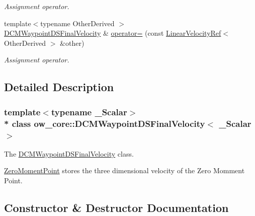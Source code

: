 \begin{DoxyCompactItemize}
\begin{DoxyCompactList}\small\item\em Assignment operator. \end{DoxyCompactList}\item 
{\footnotesize template$<$typename Other\+Derived $>$ }\\\hyperlink{classow__core_1_1DCMWaypointDSFinalVelocity}{D\+C\+M\+Waypoint\+D\+S\+Final\+Velocity} \& \hyperlink{classow__core_1_1DCMWaypointDSFinalVelocity_a66fde71eef36027e2adfe2930efc509a}{operator=} (const \hyperlink{classow__core_1_1LinearVelocityRef}{Linear\+Velocity\+Ref}$<$ Other\+Derived $>$ \&other)\hypertarget{classow__core_1_1DCMWaypointDSFinalVelocity_a66fde71eef36027e2adfe2930efc509a}{}\label{classow__core_1_1DCMWaypointDSFinalVelocity_a66fde71eef36027e2adfe2930efc509a}

\begin{DoxyCompactList}\small\item\em Assignment operator. \end{DoxyCompactList}\end{DoxyCompactItemize}


\subsection{Detailed Description}
\subsubsection*{template$<$typename \+\_\+\+Scalar$>$\\*
class ow\+\_\+core\+::\+D\+C\+M\+Waypoint\+D\+S\+Final\+Velocity$<$ \+\_\+\+Scalar $>$}

The \hyperlink{classow__core_1_1DCMWaypointDSFinalVelocity}{D\+C\+M\+Waypoint\+D\+S\+Final\+Velocity} class. 

\hyperlink{classow__core_1_1ZeroMomentPoint}{Zero\+Moment\+Point} stores the three dimensional velocity of the Zero Momment Point. 

\subsection{Constructor \& Destructor Documentation}
